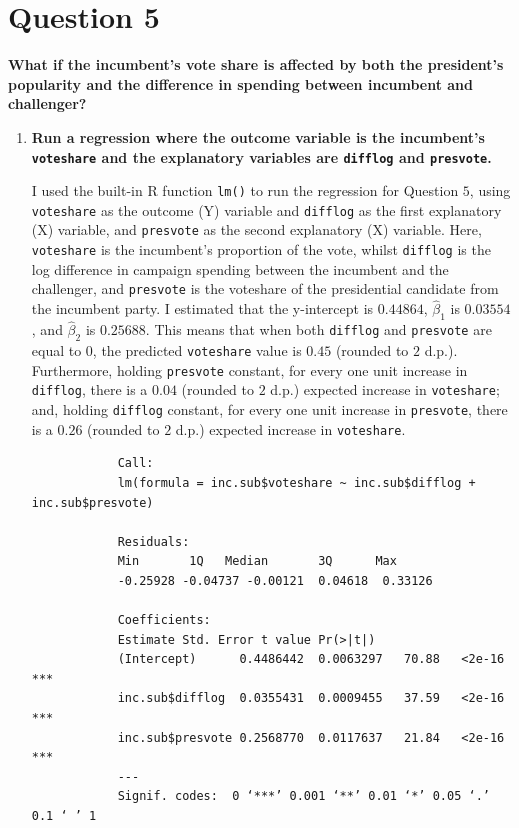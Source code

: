 \documentclass[12pt,letterpaper]{article}
\begin{document}
\section*{Question 5}
\noindent \textbf{What if the incumbent's vote share is affected by both the president's popularity and the difference in spending between incumbent and challenger?} 
	\begin{enumerate}
		\item \textbf{Run a regression where the outcome variable is the incumbent's \texttt{voteshare} and the explanatory variables are \texttt{difflog} and \texttt{presvote}.}	\vspace{0cm}
		
		I used the built-in R function \texttt{lm()} to run the regression for Question $5$, using \texttt{voteshare} as the outcome (Y) variable and \texttt{difflog} as the first explanatory (X) variable, and \texttt{presvote} as the second explanatory (X) variable. Here, \texttt{voteshare} is the incumbent's proportion of the vote, whilst \texttt{difflog} is the log difference in campaign spending between the incumbent and the challenger, and \texttt{presvote} is the voteshare of the presidential candidate from the incumbent party. I estimated that the y-intercept is $0.44864$, $\hat{\beta}_1$ is $0.03554$, and $\hat{\beta}_2$ is $0.25688$. This means that when both \texttt{difflog} and \texttt{presvote} are equal to 0, the predicted \texttt{voteshare} value is $0.45$ (rounded to $2$ d.p.). Furthermore, holding \texttt{presvote} constant, for every one unit increase in \texttt{difflog}, there is a $0.04$ (rounded to $2$ d.p.) expected increase in \texttt{voteshare}; and, holding \texttt{difflog} constant, for every one unit increase in \texttt{presvote}, there is a $0.26$ (rounded to $2$ d.p.) expected increase in \texttt{voteshare}.
		
		  
		
		\begin{verbatim}
			Call:
			lm(formula = inc.sub$voteshare ~ inc.sub$difflog + inc.sub$presvote)
			
			Residuals:
			Min       1Q   Median       3Q      Max 
			-0.25928 -0.04737 -0.00121  0.04618  0.33126 
			
			Coefficients:
			Estimate Std. Error t value Pr(>|t|)    
			(Intercept)      0.4486442  0.0063297   70.88   <2e-16 ***
			inc.sub$difflog  0.0355431  0.0009455   37.59   <2e-16 ***
			inc.sub$presvote 0.2568770  0.0117637   21.84   <2e-16 ***
			---
			Signif. codes:  0 ‘***’ 0.001 ‘**’ 0.01 ‘*’ 0.05 ‘.’ 0.1 ‘ ’ 1
			

\end{verbatim}
\end{enumerate}
\end{document}
